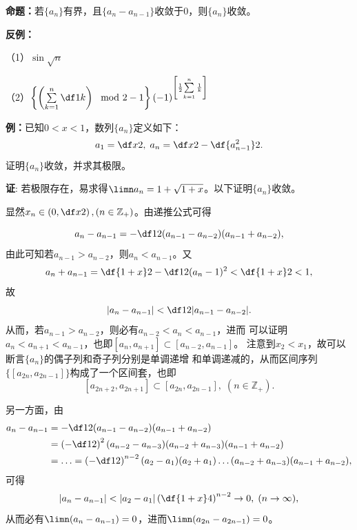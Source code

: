 \bigskip

{\bf 命题：}若$\{a_n\}$有界，且$\{a_n-a_{n-1}\}$收敛于$0$，则$\{a_n\}$收敛。

{\bf 反例：}

（1）$\sin\sqrt n$

（2）$\left\{\left(\sum\limits_{k=1}^n\df1k\right)\mod
2-1\right\}(-1)^{\left[\frac12{\sum\limits_{k=1}^n\frac1k}\right]}$

\bigskip

{\bf 例：}已知$0<x<1$，数列$\{a_n\}$定义如下：
$$a_1=\df x2,\;a_n=\df x2-\df{a_{n-1}^2}2.$$
证明$\{a_n\}$收敛，并求其极限。

{\bf 证}: 若极限存在，易求得$\limn a_n=1+\sqrt{1+x}$。以下证明$\{a_n\}$收敛。

显然$x_n\in\left(0,\df x2\right),(n\in\mathbb Z_+)$。由递推公式可得


$$a_n-a_{n-1}=-\df12(a_{n-1}-a_{n-2})(a_{n-1}+a_{n-2}),$$
由此可知若$a_{n-1}>a_{n-2}$，则$a_n<a_{n-1}$。又
$$a_n+a_{n-1}=\df{1+x}2-\df12(a_n-1)^2<\df{1+x}2<1,$$
故
$$|a_n-a_{n-1}|<\df12|a_{n-1}-a_{n-2}|.$$
从而，若$a_{n-1}>a_{n-2}$，则必有$a_{n-2}<a_n<a_{n-1}$，进而
可以证明$a_n<a_{n+1}<a_{n-1}$，也即$[a_n,a_{n+1}]\subset[a_{n-2},a_{n-1}]$。
注意到$x_2<x_1$，故可以断言$\{a_n\}$的偶子列和奇子列分别是单调递增
和单调递减的，从而区间序列$\{[a_{2n},a_{2n-1}]\}$构成了一个区间套，也即
$$[a_{2n+2},a_{2n+1}]\subset[a_{2n},a_{2n-1}],\;(n\in\mathbb Z_+).$$

另一方面，由
\begin{align}
	a_n-a_{n-1}&=-\df12(a_{n-1}-a_{n-2})(a_{n-1}+a_{n-2})\notag\\
	&=\left(-\df12\right)^2(a_{n-2}-a_{n-3})(a_{n-2}+a_{n-3})(a_{n-1}+a_{n-2})\notag\\
	&=\ldots=\left(-\df12\right)^{n-2}(a_2-a_1)(a_2+a_1)\ldots
	(a_{n-2}+a_{n-3})(a_{n-1}+a_{n-2}),\notag
\end{align}
可得
$$|a_n-a_{n-1}|<|a_2-a_1|\left(\df{1+x}4\right)^{n-2}\to0,
\;(n\to\infty),$$
从而必有$\limn(a_n-a_{n-1})=0$，进而$\limn(a_{2n}-a_{2n-1})=0$。

